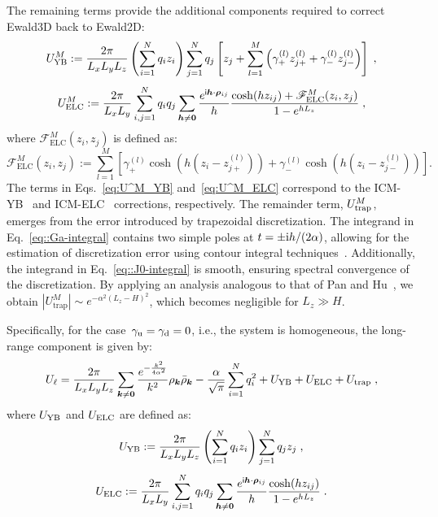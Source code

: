 The remaining terms provide the additional components required to correct Ewald3D back to Ewald2D:
\begin{equation}\label{eq:U^M_YB}
U_{\text{YB}}^{M}:=\frac{2\pi}{L_xL_yL_z}\left(\sum_{i=1}^{N}q_{i}z_{i}\right)\sum_{j=1}^{N}q_j\left[z_{j}+\sum_{l=1}^{M}\left(\gamma_{+}^{(l)}z_{j+}^{(l)}+\gamma_{-}^{(l)}z_{j-}^{(l)}\right)\right]\;,
\end{equation}
\begin{equation}\label{eq:U^M_ELC}
U_{\text{ELC}}^{M}:=\frac{2\pi}{L_xL_y}\sum_{i,j=1}^{N}q_iq_j\sum_{\bm{h}\neq \bm{0}} \frac{e^{\mathsf i \bm{h}\cdot\bm{\rho}_{ij}}}{h}\frac{\cosh(hz_{ij})+\mathscr{F}_{\text{ELC}}^M(z_i,z_j)}{1-e^{hL_z}}\;,
\end{equation}
where $\mathscr{F}_{\text{ELC}}^M(z_i,z_j)$ is defined as:
\begin{equation}\label{eq::23}
\mathscr{F}_{\text{ELC}}^M(z_i,z_j):=\sum\limits_{l=1}^{M}\left[\gamma_{+}^{(l)}\cosh(h(z_i-z_{j+}^{(l)}))+\gamma_{-}^{(l)}\cosh(h(z_i-z_{j-}^{(l)}))\right].
\end{equation}
The terms in Eqs.~\eqref{eq:U^M_YB} and~\eqref{eq:U^M_ELC} correspond to the ICM-YB~\cite{yuan2021particle} and ICM-ELC~\cite{tyagi2008electrostatic} corrections, respectively. 
The remainder term, $U^{M}_{\text{trap}}$, emerges from the error introduced by trapezoidal discretization. 
The integrand in Eq.~\eqref{eq::Ga-integral} contains two simple poles at $t=\pm {\text{i}}h/(2\alpha)$, allowing for the estimation of discretization error using contour integral techniques~\cite{trefethen2014Rev}. 
Additionally, the integrand in Eq.~\eqref{eq::J0-integral} is smooth, %
ensuring spectral convergence of the discretization. 
By applying an analysis analogous to that of Pan and Hu~\cite{pan2014rigorous}, we obtain $|U_{\text{trap}}^{M}|\sim e^{-\alpha^2(L_z-H)^2}$, which becomes negligible for $L_z \gg H$.  

Specifically, for the case~$\gamma_{\text{u}}=\gamma_{\text{d}}=0$, i.e., the system is homogeneous, the long-range component is given by:
\begin{equation}\label{eq::U3D_Four}
	\begin{split}
		U_{\ell} = \frac{2\pi}{L_xL_yL_z}\sum_{\bm{k}\neq \bm{0}}\frac{e^{-\frac{k^2}{4\alpha^2}}}{k^2}\rho_{\bm{k}}\bar{\rho}_{\bm{k}} - \frac{\alpha}{\sqrt{\pi}}\sum_{i=1}^{N}q_i^2+ U_{\text{YB}} + U_{\text{ELC}} + U_{\text{trap}}\;,
	\end{split}
\end{equation}
where $U_{\text{YB}}$ and $U_{\text{ELC}}$ are defined as:
\begin{equation}\label{eq::U3D_YB}
	U_{\text{YB}} := \frac{2\pi}{L_xL_yL_z}\left(\sum_{i=1}^{N}q_{i}z_{i}\right)\sum_{j=1}^{N}q_j z_{j}\;,
\end{equation}
\begin{equation}\label{eq::U3D_ELC}
	U_{\text{ELC}} := \frac{2\pi}{L_xL_y}\sum_{i,j=1}^{N}q_iq_j\sum_{\bm{h}\neq \bm{0}} \frac{e^{\mathsf i \bm{h}\cdot\bm{\rho}_{ij}}}{h}\frac{\cosh(hz_{ij})}{1-e^{hL_z}}\;.
\end{equation}



